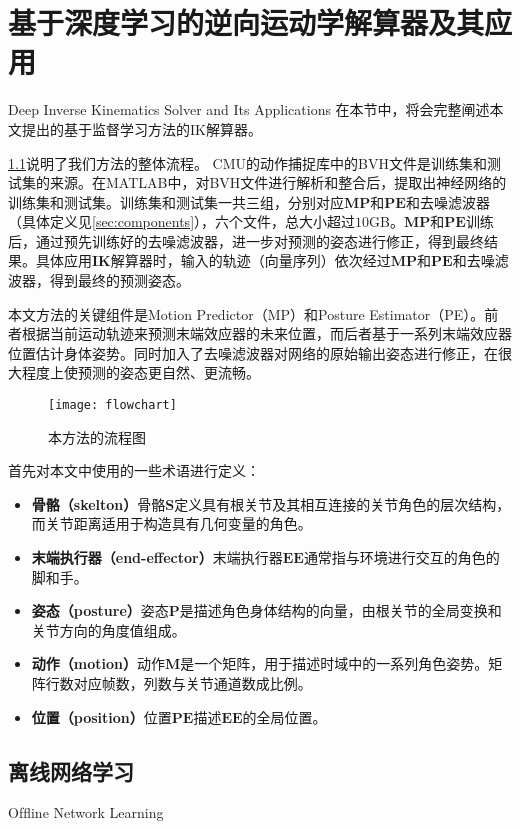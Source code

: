 \chapter{基于深度学习的逆向运动学解算器及其应用}{Deep Inverse Kinematics Solver and Its Applications}
在本节中，将会完整阐述本文提出的基于监督学习方法的IK解算器。

\cref{fig:flowchart}说明了我们方法的整体流程。 CMU的动作捕捉库中的BVH文件是训练集和测试集的来源。在MATLAB中，对BVH文件进行解析和整合后，提取出神经网络的训练集和测试集。训练集和测试集一共三组，分别对应$\mathbf{MP}$和$\mathbf{PE}$和去噪滤波器（具体定义见\ref{sec:components}），六个文件，总大小超过$10$GB。$\mathbf{MP}$和$\mathbf{PE}$训练后，通过预先训练好的去噪滤波器，进一步对预测的姿态进行修正，得到最终结果。具体应用$\mathbf{IK}$解算器时，输入的轨迹（向量序列）依次经过$\mathbf{MP}$和$\mathbf{PE}$和去噪滤波器，得到最终的预测姿态。

本文方法的关键组件是Motion Predictor（MP）和Posture Estimator（PE）。前者根据当前运动轨迹来预测末端效应器的未来位置，而后者基于一系列末端效应器位置估计身体姿势。同时加入了去噪滤波器对网络的原始输出姿态进行修正，在很大程度上使预测的姿态更自然、更流畅。
\begin{figure}[!h]
	\centering
	\texttt{[image: flowchart]}
	\caption[]{\label{fig:flowchart}
		本方法的流程图
	}
\end{figure}

首先对本文中使用的一些术语进行定义：
\begin{itemize}
	\label{item:identify}
\item\textbf{骨骼（skelton）}骨骼$\mathbf{S}$定义具有根关节及其相互连接的关节角色的层次结构，而关节距离适用于构造具有几何变量的角色。
\item\textbf{末端执行器（end-effector）}末端执行器$\mathbf{EE}$通常指与环境进行交互的角色的脚和手。
\item\textbf{姿态（posture）}姿态$\mathbf{P}$是描述角色身体结构的向量，由根关节的全局变换和关节方向的角度值组成。
\item\textbf{动作（motion）}动作$\mathbf{M}$是一个矩阵，用于描述时域中的一系列角色姿势。矩阵行数对应帧数，列数与关节通道数成比例。
\item\textbf{位置（position）}位置$\mathbf{PE}$描述$\mathbf{EE}$的全局位置。
\end{itemize}

\section{离线网络学习}{Ofﬂine Network Learning}

